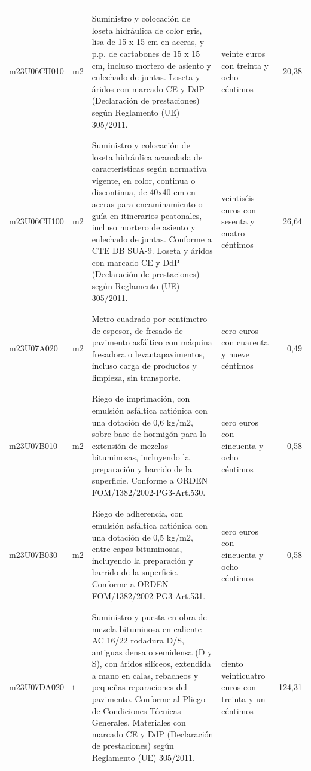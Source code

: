 \documentclass{book}%
\begin{document}
\begin{longtable}{|l|l|p{5cm}|p{3cm}|r|}
&&&&\\%
&&&&\\%
m23U06CH010&m2&Suministro y colocación de loseta hidráulica de color gris, lisa de 15 x 15 cm en aceras, y p.p. de cartabones de 15 x 15 cm, incluso mortero de asiento y enlechado de juntas. Loseta y áridos con marcado CE y DdP (Declaración de prestaciones) según Reglamento (UE) 305/2011.&veinte euros con treinta y ocho céntimos&20,38\\%
&&&&\\%
&&&&\\%
m23U06CH100&m2&Suministro y colocación de loseta hidráulica acanalada de características según normativa vigente, en color, continua o discontinua, de 40x40 cm en aceras para encaminamiento o guía en itinerarios peatonales, incluso mortero de asiento y enlechado de juntas. Conforme a CTE DB SUA{-}9. Loseta y áridos con marcado CE y DdP (Declaración de prestaciones) según Reglamento (UE) 305/2011.&veintiséis euros con sesenta y cuatro céntimos&26,64\\%
&&&&\\%
&&&&\\%
m23U07A020&m2&Metro cuadrado por centímetro de espesor, de fresado de pavimento asfáltico con máquina fresadora o levantapavimentos, incluso carga de productos y limpieza, sin transporte.&cero euros con cuarenta y nueve céntimos&0,49\\%
&&&&\\%
&&&&\\%
m23U07B010&m2&Riego de imprimación, con emulsión asfáltica catiónica con una dotación de 0,6 kg/m2, sobre base de hormigón para la extensión de mezclas bituminosas, incluyendo la preparación y barrido de la superficie. Conforme a ORDEN FOM/1382/2002{-}PG3{-}Art.530.&cero euros con cincuenta y ocho céntimos&0,58\\%
&&&&\\%
&&&&\\%
m23U07B030&m2&Riego de adherencia, con emulsión asfáltica catiónica con una dotación de 0,5 kg/m2, entre capas bituminosas, incluyendo la preparación y barrido de la superficie. Conforme a ORDEN FOM/1382/2002{-}PG3{-}Art.531.&cero euros con cincuenta y ocho céntimos&0,58\\%
&&&&\\%
&&&&\\%
m23U07DA020&t&Suministro y puesta en obra de mezcla bituminosa en caliente AC 16/22 rodadura D/S, antiguas densa o semidensa (D y S), con áridos silíceos, extendida a mano en calas, rebacheos y pequeñas reparaciones del pavimento. Conforme al Pliego de Condiciones Técnicas Generales. Materiales con marcado CE y DdP (Declaración de prestaciones) según Reglamento (UE) 305/2011.&ciento veinticuatro euros con treinta y un céntimos&124,31\\%

\end{longtable}
\end{document}
